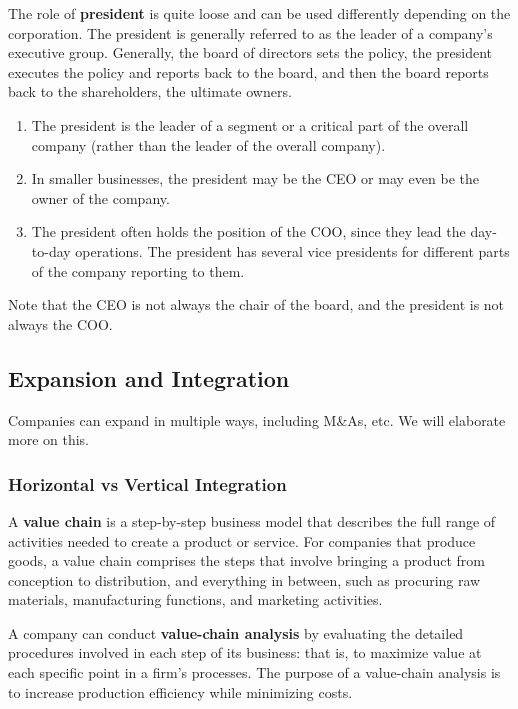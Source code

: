 \documentclass{article}
\begin{document}
    \begin{definition}[President]
      The role of \textbf{president} is quite loose and can be used differently depending on the corporation. The president is generally referred to as the leader of a company's executive group. Generally, the board of directors sets the policy, the president executes the policy and reports back to the board, and then the board reports back to the shareholders, the ultimate owners. 
      \begin{enumerate}
          \item The president is the leader of a segment or a critical part of the overall company (rather than the leader of the overall company). 
          \item In smaller businesses, the president may be the CEO or may even be the owner of the company. 
          \item The president often holds the position of the COO, since they lead the day-to-day operations. The president has several vice presidents for different parts of the company reporting to them. 
      \end{enumerate}
    \end{definition}

    Note that the CEO is not always the chair of the board, and the president is not always the COO. 

  \subsection{Expansion and Integration}

    Companies can expand in multiple ways, including M\&As, etc. We will elaborate more on this. 

    \subsubsection{Horizontal vs Vertical Integration}

      \begin{definition}
        A \textbf{value chain} is a step-by-step business model that describes the full range of activities needed to create a product or service. For companies that produce goods, a value chain comprises the steps that involve bringing a product from conception to distribution, and everything in between, such as procuring raw materials, manufacturing functions, and marketing activities. 

        A company can conduct \textbf{value-chain analysis} by evaluating the detailed procedures involved in each step of its business: that is, to maximize value at each specific point in a firm's processes. The purpose of a value-chain analysis is to increase production efficiency while minimizing costs. 
      \end{definition}
\end{document}
